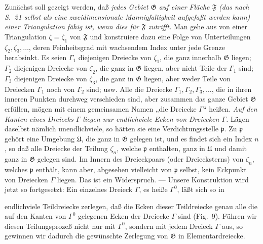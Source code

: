 \documentclass{article}
\begin{document}
Zunächst soll gezeigt werden, daß \emph{jedes Gebiet $\mathfrak{G}$ auf einer Fläche $\mathfrak{F}$ (das nach S.\ 21 selbst als eine zweidimensionale Mannigfaltigkeit aufgefaßt werden kann) einer Triangulation fähig ist, wenn dies für $\mathfrak{F}$ zutrifft.} Man gehe aus von einer Triangulation $\zeta = \zeta_1$ von $\mathfrak{F}$ und konstruiere dazu eine Folge von Unterteilungen $\zeta_2, \zeta_3, \dots$, deren Feinheitsgrad mit wachsendem Index unter jede Grenze herabsinkt. Es seien $\varGamma_1$ diejenigen Dreiecke von $\zeta_1$, die ganz innerhalb $\mathfrak{G}$ liegen; $\varGamma_2$ diejenigen Dreiecke von $\zeta_2$, die ganz in $\mathfrak{G}$ liegen, aber nicht Teile der $\varGamma_1$ sind; $\varGamma_3$ diejenigen Dreiecke von $\zeta_3$, die ganz in $\mathfrak{G}$ liegen, aber weder Teile von Dreiecken $\varGamma_1$ noch von $\varGamma_2$ sind; usw. Alle die Dreiecke $\varGamma_1, \varGamma_2, \varGamma_3, \dots$, die in ihren inneren Punkten durchweg verschieden sind, aber zusammen das ganze Gebiet $\mathfrak{G}$ erfüllen, mögen mit einem gemeinsamen Namen „die Dreiecke $\varGamma$“ heißen. \emph{Auf den Kanten eines Dreiecks $\varGamma$ liegen nur endlichviele Ecken von Dreiecken $\varGamma$.} Lägen daselbst nämlich unendlichviele, so hätten sie eine Verdichtungsstelle $\mathfrak{p}$. Zu $\mathfrak{p}$ gehört eine Umgebung $\mathfrak{U}$, die ganz in $\mathfrak{G}$ gelegen ist, und es findet sich ein Index $n$, so daß alle Dreiecke der Teilung $\zeta_n$, welche $\mathfrak{p}$ enthalten, ganz in $\mathfrak{U}$ und damit ganz in $\mathfrak{G}$ gelegen sind. Im Innern des Dreieckpaars (oder Dreiecksterns) von $\zeta_n$, welches $\mathfrak{p}$ enthält, kann aber, abgesehen vielleicht von $\mathfrak{p}$ selbst, kein Eckpunkt von Dreiecken $\varGamma$ liegen. Das ist ein Widerspruch. --- Unsere Konstruktion wird jetzt so fortgesetzt: Ein einzelnes Dreieck $\varGamma$, es heiße $\varGamma^0$, läßt sich so in

endlichviele Teildreiecke zerlegen, daß die Ecken dieser Teildreiecke genau alle die auf den Kanten von $\varGamma^0$ gelegenen Ecken der Dreiecke $\varGamma$ sind (Fig.~9). Führen wir diesen Teilungsprozeß nicht nur mit $\varGamma^0$, sondern mit jedem Dreieck $\varGamma$ aus, so gewinnen wir dadurch die gewünschte Zerlegung von $\mathfrak{G}$ in Elementardreiecke.

\end{document}
